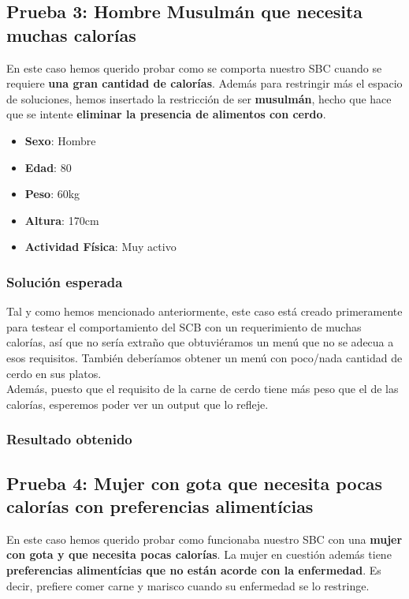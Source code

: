 \documentclass[12]{article}
\begin{document}
\subsection{Prueba 3: Hombre Musulmán que necesita muchas calorías}
En este caso hemos querido probar como se comporta nuestro SBC cuando se requiere \textbf{una gran cantidad de calorías}. Además para restringir más el espacio de soluciones, hemos insertado la restricción de ser \textbf{musulmán}, hecho que hace que se intente \textbf{eliminar la presencia de alimentos con cerdo}. 

\begin{itemize}
\item \textbf{Sexo}: Hombre
\item \textbf{Edad}: 80
\item \textbf{Peso}: 60kg
\item \textbf{Altura}: 170cm
\item \textbf{Actividad Física}: Muy activo
\end{itemize}

\subsubsection{Solución esperada}
Tal y como hemos mencionado anteriormente, este caso está creado primeramente para testear el comportamiento del SCB con un requerimiento de muchas calorías, así que no sería extraño que obtuviéramos un menú que no se adecua a esos requisitos. También deberíamos obtener un menú con poco/nada cantidad de cerdo en sus platos. 
\\
Además, puesto que el requisito de la carne de cerdo tiene más peso que el de las calorías, esperemos poder ver un output que lo refleje. 

\subsubsection{Resultado obtenido}


\subsection{Prueba 4: Mujer con gota que necesita pocas calorías con preferencias alimentícias}

En este caso hemos querido probar como funcionaba nuestro SBC con una \textbf{mujer con gota y que necesita pocas calorías}. La mujer en cuestión además tiene \textbf{preferencias alimentícias que no están acorde con la enfermedad}. Es decir, prefiere comer carne y marisco cuando su enfermedad se lo restringe. 
\end{document}
